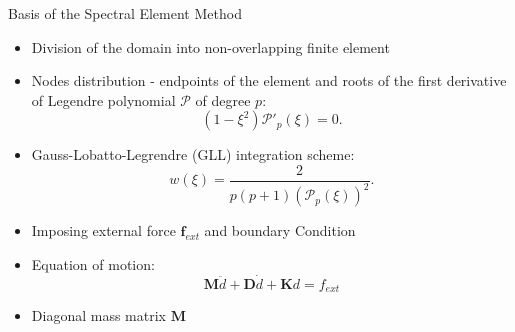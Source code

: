 \documentclass[10pt]{beamer} %
\begin{document}
	
\begin{frame}[label=frame7]{Basis of the Spectral Element Method}
	\begin{itemize}
		\item Division of the domain into non-overlapping finite element
		\item Nodes distribution - endpoints of the element and roots of the first derivative of Legendre polynomial \(\mathcal{P}\) of degree \(p\):
			\begin{equation*}
				(1-\xi^2)\mathcal{P}'_{p}(\xi)=0.
				\label{eq:nodes}
			\end{equation*}
		\item Gauss-Lobatto-Legrendre (GLL) integration scheme:
			\begin{equation*}
				{w(\xi)} = \frac{2}{p(p+1)(\mathcal{P}_{p}(\xi))^2}.
				\label{eq:weight}
			\end{equation*}
		\item Imposing external force $\textbf{f}_{ext}$ and boundary Condition
		\item Equation of motion:
		\begin{equation*}
			\label{eq:motion}
			\textbf{M} \ddot{d} + \textbf{D} \dot{d} + \textbf{K} d = f_{ext}
		\end{equation*}
		\item Diagonal mass matrix \(\textbf{M}\)
	\end{itemize}
\end{frame}
\end{document}
